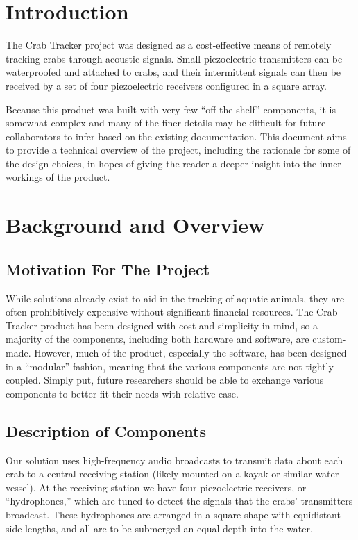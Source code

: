 \documentclass[12pt]{article}
\begin{document}
\section{Introduction}

The Crab Tracker project was designed as a cost-effective means of remotely
tracking crabs through acoustic signals.
Small piezoelectric transmitters can be waterproofed and attached to crabs,
and their intermittent signals can then be received by a set of four
piezoelectric receivers configured in a square array.

Because this product was built with very few ``off-the-shelf'' components,
it is somewhat complex and many of the finer details may be difficult for
future collaborators to infer based on the existing documentation.
This document aims to provide a technical overview of the project, including
the rationale for some of the design choices, in hopes of giving the reader
a deeper insight into the inner workings of the product.

\section{Background and Overview}

\subsection{Motivation For The Project}

While solutions already exist to aid in the tracking of aquatic animals,
they are often prohibitively expensive without significant financial resources.
The Crab Tracker product has been designed with cost and simplicity in mind,
so a majority of the components, including both hardware and software, are
custom-made.
However, much of the product, especially the software, has been designed
in a ``modular'' fashion, meaning that the various components are not tightly
coupled.
Simply put, future researchers should be able to exchange various components
to better fit their needs with relative ease.

\subsection{Description of Components}

Our solution uses high-frequency audio broadcasts to transmit data about
each crab to a central receiving station (likely mounted on a kayak or similar
water vessel).
At the receiving station we have four piezoelectric receivers, or
``hydrophones,'' which are tuned to detect the signals that the crabs'
transmitters broadcast.
These hydrophones are arranged in a square shape with equidistant side
lengths, and all are to be submerged an equal depth into the water.
\end{document}
